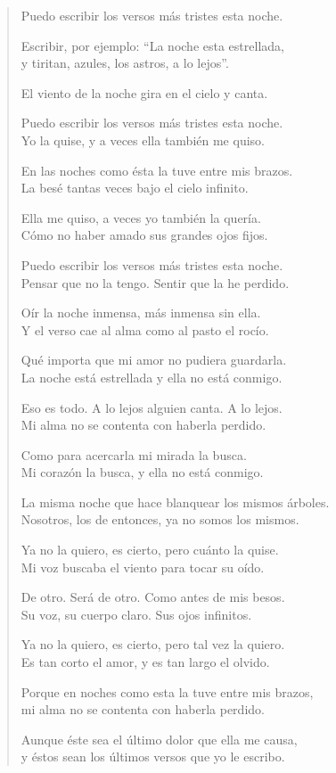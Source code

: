 \documentclass[12pt]{article}
\begin{document}
\clearpage
{}
\begin{verse}

Puedo escribir los versos más tristes esta noche.  

Escribir, por ejemplo: ``La noche esta estrellada,\\
y tiritan, azules, los astros, a lo lejos''.  

El viento de la noche gira en el cielo y canta.  

Puedo escribir los versos más tristes esta noche.\\
Yo la quise, y a veces ella también me quiso.  

En las noches como ésta la tuve entre mis brazos.\\
La besé tantas veces bajo el cielo infinito.  

Ella me quiso, a veces yo también la quería.\\
Cómo no haber amado sus grandes ojos fijos.  

Puedo escribir los versos más tristes esta noche.\\
Pensar que no la tengo. Sentir que la he perdido.  

Oír la noche inmensa, más inmensa sin ella.\\
Y el verso cae al alma como al pasto el rocío.  

Qué importa que mi amor no pudiera guardarla.\\
La noche está estrellada y ella no está conmigo.  

Eso es todo. A lo lejos alguien canta. A lo lejos.\\
Mi alma no se contenta con haberla perdido.  

Como para acercarla mi mirada la busca.\\
Mi corazón la busca, y ella no está conmigo.  

La misma noche que hace blanquear los mismos árboles.\\
Nosotros, los de entonces, ya no somos los mismos.  

Ya no la quiero, es cierto, pero cuánto la quise.\\
Mi voz buscaba el viento para tocar su oído.  

De otro. Será de otro. Como antes de mis besos.\\
Su voz, su cuerpo claro. Sus ojos infinitos.  

Ya no la quiero, es cierto, pero tal vez la quiero.\\
Es tan corto el amor, y es tan largo el olvido.  

Porque en noches como esta la tuve entre mis brazos,\\
mi alma no se contenta con haberla perdido.  

Aunque éste sea el último dolor que ella me causa,\\
y éstos sean los últimos versos que yo le escribo.

\end{verse}
\end{document}
